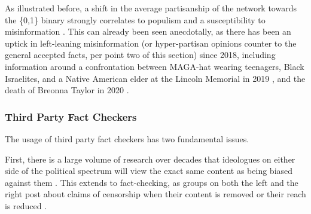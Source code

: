 \documentclass[preprint,review,12pt]{elsarticle}
\begin{document}
 As illustrated before, a shift in the average partisanship of the network towards the \{0,1\} binary strongly correlates to populism and a susceptibility to misinformation \cite{hopp2020people,kahan2012ideology,mourao2019fake,shin2017partisan,swire2017processing,vargo2018agenda}. This can already been seen anecdotally, as there has been an uptick in left-leaning misinformation (or hyper-partisan opinions counter to the general accepted facts, per point two of this section) since 2018, including information around a confrontation between MAGA-hat wearing teenagers, Black Israelites, and a Native American elder at the Lincoln Memorial in 2019 \cite{sacks2019maga,healy2019believing,pond2020complexity}, and the death of Breonna Taylor in 2020 \cite{duvall2020fact,kim2020fact}. 

 \subsubsection{Third Party Fact Checkers}
  \label{Third Party Fact Checkers Sections}
 The usage of third party fact checkers has two fundamental issues.
 
 First, there is a large volume of research over decades that ideologues on either side of the political spectrum will view the exact same content as being biased against them \cite{arpan2003experimental,baum2008eye,christen2002hostile,gunther2001predicting,gunther2004mapping,baum2004issue,gussin2004eye,lee2005liberal,vallone1985hostile}. This extends to fact-checking, as groups on both the left and the right post about claims of censorship when their content is removed or their reach is reduced \cite{Dreyfuss2020Now,Post2020Facebook,Millhiser2018Facebook}. 
 
\end{document}
